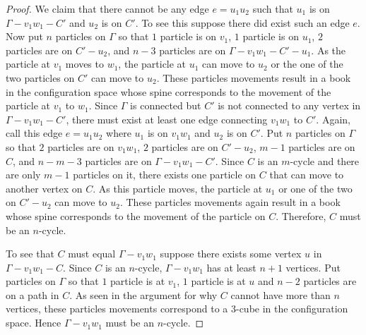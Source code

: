 \begin{proof}
We claim that there cannot be any edge \(e = u_1 u_2\) such that \(u_1\) is on \(\Gamma - v_1 w_1 - C'\) and \(u_2\) is on \(C'\).
To see this suppose there did exist such an edge \(e\).
Now put \(n\) particles on \(\Gamma\) so that \(1\) particle is on \(v_1\), \(1\) particle is on \(u_1\), \(2\) particles are on \(C' - u_2\), 
and \(n - 3\) particles are on \(\Gamma - v_1 w_1 - C' - u_1\).
As the particle at \(v_1\) moves to \(w_1\), the particle at \(u_1\) can move to \(u_2\) or the one of the two particles on \(C'\) can move to \(u_2\).
These particles movements result in a book in the configuration space whose spine corresponds to the movement of the particle at \(v_1\) to \(w_1\).
Since \(\Gamma\) is connected but \(C'\) is not connected to any vertex in \(\Gamma - v_1 w_1 - C'\),
there must exist at least one edge connecting \(v_1 w_1\) to \(C'\).
Again, call this edge \(e = u_1 u_2\) where \(u_1\) is on \(v_1 w_1\) and \(u_2\) is on \(C'\).
Put \(n\) particles on \(\Gamma\) so that \(2\) particles are on \(v_1 w_1\), \(2\) particles are on \(C' - u_2\), \(m - 1\) particles are on \(C\),
and \(n - m - 3\) particles are on \(\Gamma - v_1 w_1 - C'\).
Since \(C\) is an \(m\)-cycle and there are only \(m - 1\) particles on it, there exists one particle on \(C\) that can move to another vertex on \(C\).
As this particle moves, the particle at \(u_1\) or one of the two on \(C' - u_2\) can move to \(u_2\).
These particles movements again result in a book whose spine corresponds to the movement of the particle on \(C\).
Therefore, \(C\) must be an \(n\)-cycle.

To see that \(C\) must equal \(\Gamma - v_1 w_1\) suppose there exists some vertex \(u\) in \(\Gamma - v_1 w_1 - C\).
Since \(C\) is an \(n\)-cycle, \(\Gamma - v_1 w_1\) has at least \(n + 1\) vertices.
Put particles on \(\Gamma\) so that \(1\) particle is at \(v_1\), \(1\) particle is at \(u\) and \(n-2\) particles are on a path in \(C\).
As seen in the argument for why \(C\) cannot have more than \(n\) vertices, these particles movements correspond to a \(3\)-cube in the configuration
space. Hence \(\Gamma - v_1 w_1\) must be an \(n\)-cycle.
\end{proof}

